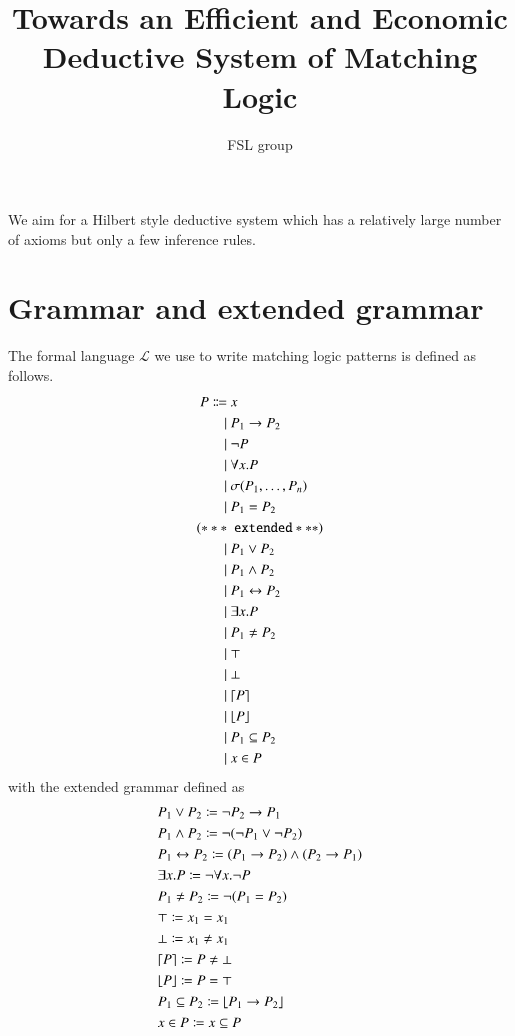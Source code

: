 \documentclass{article}
\title{Towards an Efficient and Economic Deductive System of Matching Logic}
\author{FSL group}
\DeclarePairedDelimiter\ceil{\lceil}{\rceil}
\DeclarePairedDelimiter\floor{\lfloor}{\rfloor}
\begin{document}
\maketitle
We aim for a Hilbert style deductive system which has a relatively large number of axioms but only a few inference rules. 

\section{Grammar and extended grammar}

The formal language $\mathcal{L}$ we use to write matching logic patterns is defined as follows.
\begin{align*}
P \Coloneqq\  & x \\
       \mid\  & P_1 \to P_2 \\
       \mid\  & \neg P \\
       \mid\  & \forall x . P \\
       \mid\  & \sigma(P_1,\dots,P_n) \\
       \mid\  & P_1 = P_2 \\
 {\tt (*** }\ & \ {\tt  extended  ***)} \\
       \mid\  & P_1 \vee P_2 \\
       \mid\  & P_1 \wedge P_2 \\
       \mid\  & P_1 \leftrightarrow P_2 \\
       \mid\  & \exists x . P \\
       \mid\  & P_1 \neq P_2 \\
       \mid\  & \top \\
       \mid\  & \bot \\
       \mid\  & \ceil*{P} \\
       \mid\  & \floor*{P} \\
       \mid\  & P_1 \subseteq P_2 \\
       \mid\  & x \in P
\end{align*}
with the extended grammar defined as
\begin{align*}
&P_1 \vee P_2 \coloneqq \neg P_2 \to P_1 \\
&P_1 \wedge P_2 \coloneqq \neg (\neg P_1 \vee \neg P_2) \\
&P_1 \leftrightarrow P_2 \coloneqq (P_1 \to P_2) \wedge (P_2 \to P_1) \\
&\exists x . P \coloneqq \neg \forall x . \neg P \\
&P_1 \neq P_2 \coloneqq \neg (P_1 = P_2) \\
&\top \coloneqq x_1 = x_1 \\
&\bot \coloneqq x_1 \neq x_1 \\
&\ceil*{P} \coloneqq P \neq \bot \\
&\floor*{P} \coloneqq P = \top \\
&P_1 \subseteq P_2 \coloneqq \floor*{P_1 \to P_2} \\
&x \in P \coloneqq x \subseteq P
\end{align*}
\end{document}
